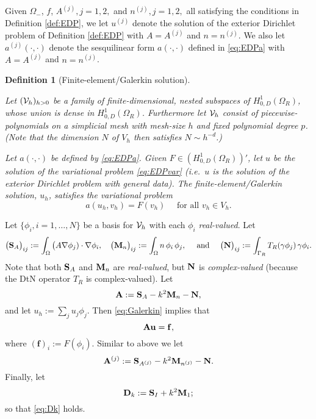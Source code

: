 \documentclass[10pt]{article}%
\newtheorem{definition}[theorem]{Definition}
\numberwithin{equation}{section}
\newcommand{\beq}{\begin{equation}}
\newcommand{\eeq}{\end{equation}}
\newcommand{\beqs}{\begin{equation*}}
\newcommand{\eeqs}{\end{equation*}}
\newcommand{\cV}{{\cal V}}
\newcommand{\bv}{\mathbf{v}}
\newcommand{\bu}{\mathbf{u}}
\newcommand{\bff}{\mathbf{f}}
\newcommand{\Oi}{{\Omega_-}}
\newcommand{\GR}{{\Gamma_R}}
\newcommand{\HoDk}{{H^1_{0,D}(\domain_R)}}
\newcommand{\HoDkk}{{H^1_{k}(\domain_R)}}
\newcommand*{\N}[1]{\left\|#1\right\|}
\newcommand{\tfa}{\text{ for all }}
\newcommand{\tand}{\text{ and }}
\newcommand{\tst}{\text{ such that }}
\newcommand{\domain}{\Omega}
\newcommand{\matrixA}{{\bf A}}
\newcommand{\matrixD}{{\bf D}}
\newcommand{\matrixS}{{\bf S}}
\newcommand{\matrixM}{{\bf M}}
\newcommand{\matrixN}{{\bf N}}
\newcommand{\matrixAj}{{\bf A}^{(j)}}
\newcommand{\coeffA}{A}
\newcommand{\coeffn}{n}
\newcommand{\coeffAj}{A^{(j)}}
\newcommand{\coeffnj}{n^{(j)}}
\begin{document}
Given $\Oi$, $f$, $\coeffAj, j=1,2,$ and $\coeffnj, j=1,2,$ all satisfying the conditions in Definition \ref{def:EDP}, we let  $u^{(j)}$ denote the solution of the exterior Dirichlet problem of Definition \ref{def:EDP} with $\coeffA=\coeffAj$ and $\coeffn= \coeffnj$.
We also let $a^{(j)}(\cdot,\cdot)$ denote the sesquilinear form $a(\cdot,\cdot)$ defined in \eqref{eq:EDPa} with $\coeffA=\coeffAj$ and $\coeffn= \coeffnj$.

\begin{definition}[Finite-element/Galerkin solution]\label{def:Galerkin}

Let $(\cV_h)_{h>0}$ be a family of finite-dimensional, nested subspaces of $H_{0,D}^1(\domain_R)$, whose union is dense in $H_{0,D}^1(\domain_R)$. Furthermore let $\cV_h$ consist of piecewise-polynomials on a simplicial mesh with mesh-size $h$
and fixed polynomial degree $p$. (Note that the dimension $N$ of $V_h$ then satisfies $N\sim h^{-d}$.)


Let $a(\cdot,\cdot)$ be defined by \eqref{eq:EDPa}. Given $F\in (\HoDk)'$, let $u$ be the solution of the variational problem \eqref{eq:EDPvar} (i.e.~$u$ is the solution of the exterior Dirichlet problem with general data). The \emph{finite-element/Galerkin solution}, $u_h$, satisfies the variational problem
\beq\label{eq:Galerkin}
a(u_h,v_h)=F(v_h) \quad \tfa v_h \in V_h.
\eeq
\end{definition}


Let $\{\phi_i, i= 1, \ldots, N\}$ be a basis for $\cV_h$ with each $\phi_i$ \emph{real-valued}.
Let 
\beq\label{eq:matrixSjdef}
\big(\matrixS_{A}\big)_{ij}:= \int_\Omega \big(A \nabla \phi_j)\cdot\nabla \phi_i, \quad
\big(\matrixM_{n}\big)_{ij}:= \int_\Omega n\,\phi_i\, \phi_j,
\quad\tand\quad
\big(\matrixN\big)_{ij}:= \int_{\GR} T_R (\gamma\phi_j) \,\gamma \phi_i.
\eeq
Note that both $\matrixS_A$ and $\matrixM_n$ are \emph{real-valued}, but $\matrixN$ is \emph{complex-valued} (because the DtN operator $T_R$ is complex-valued).
Let
\beq\label{eq:matrixAdef}
\matrixA := \matrixS_{A} - k^2 \matrixM_{n} - \matrixN,
\eeq
and let $u_h:= \sum_j u_j \phi_j$. Then \eqref{eq:Galerkin} implies that
\beqs
\matrixA \bu = \bff,
\eeqs
where $(\bff)_i := F(\phi_i)$.
Similar to above we let 
\beq\label{eq:matrixAjdef}
\matrixAj := \matrixS_{A^{(j)}} - k^2 \matrixM_{n^{(j)}} - \matrixN.
\eeq
Finally, let 
\beq\label{eq:Dk2}
\matrixD_k:= \matrixS_I + k^2 \matrixM_1;
\eeq
so that \eqref{eq:Dk} holds.
\end{document}
